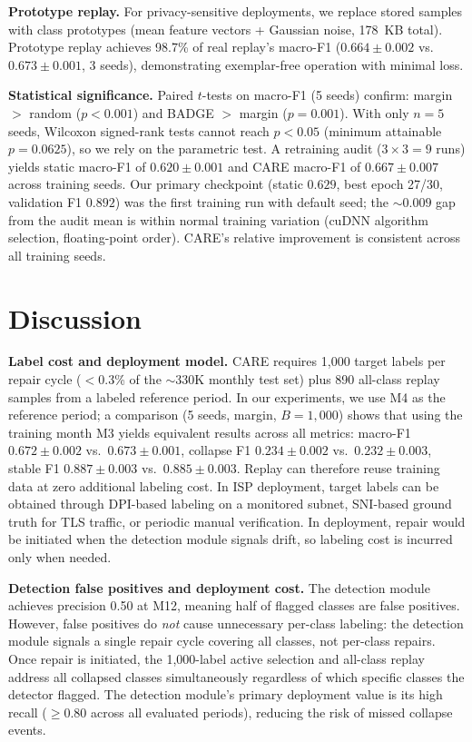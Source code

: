 \documentclass[journal]{IEEEtran}
\newcommand{\ours}{CARE}  %
\begin{document}
\textbf{Prototype replay.}
\label{sec:proto_replay}
For privacy-sensitive deployments, we replace stored samples with class prototypes (mean feature vectors + Gaussian noise, 178~KB total).
Prototype replay achieves 98.7\% of real replay's macro-F1 ($0.664{\pm}0.002$ vs.\ $0.673{\pm}0.001$, 3 seeds), demonstrating exemplar-free operation with minimal loss.

\textbf{Statistical significance.}
\label{sec:significance}
Paired $t$-tests on macro-F1 (5 seeds) confirm: margin $>$ random ($p{<}0.001$) and BADGE $>$ margin ($p{=}0.001$).
With only $n{=}5$ seeds, Wilcoxon signed-rank tests cannot reach $p{<}0.05$ (minimum attainable $p{=}0.0625$), so we rely on the parametric test.
A retraining audit ($3{\times}3{=}9$ runs) yields static macro-F1 of $0.620{\pm}0.001$ and CARE macro-F1 of $0.667{\pm}0.007$ across training seeds.
Our primary checkpoint (static $0.629$, best epoch 27/30, validation F1 $0.892$) was the first training run with default seed; the ${\sim}0.009$ gap from the audit mean is within normal training variation (cuDNN algorithm selection, floating-point order). CARE's relative improvement is consistent across all training seeds.


\section{Discussion}
\label{sec:discussion}

\textbf{Label cost and deployment model.}
\ours{} requires 1{,}000 target labels per repair cycle ($<$0.3\% of the ${\sim}$330K monthly test set) plus 890 all-class replay samples from a labeled reference period.
In our experiments, we use M4 as the reference period; a comparison (5 seeds, margin, $B{=}1{,}000$) shows that using the training month M3 yields equivalent results across all metrics: macro-F1 $0.672{\pm}0.002$ vs.\ $0.673{\pm}0.001$, collapse F1 $0.234{\pm}0.002$ vs.\ $0.232{\pm}0.003$, stable F1 $0.887{\pm}0.003$ vs.\ $0.885{\pm}0.003$.
Replay can therefore reuse training data at zero additional labeling cost.
In ISP deployment, target labels can be obtained through DPI-based labeling on a monitored subnet, SNI-based ground truth for TLS traffic, or periodic manual verification.
In deployment, repair would be initiated when the detection module signals drift, so labeling cost is incurred only when needed.

\textbf{Detection false positives and deployment cost.}
The detection module achieves precision 0.50 at M12, meaning half of flagged classes are false positives.
However, false positives do \textit{not} cause unnecessary per-class labeling: the detection module signals a single repair cycle covering all classes, not per-class repairs.
Once repair is initiated, the 1{,}000-label active selection and all-class replay address all collapsed classes simultaneously regardless of which specific classes the detector flagged.
The detection module's primary deployment value is its high recall ($\geq$0.80 across all evaluated periods), reducing the risk of missed collapse events.
\end{document}
